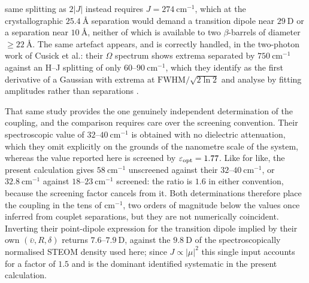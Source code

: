 \documentclass[journal=jpcbfk, manuscript=article, layout=twocolumn, doi=true]{achemso}
\begin{document}
same splitting as $2|J|$ instead requires $J=274~\mathrm{cm^{-1}}$, which at the crystallographic $25.4~\text{\AA}$ separation would demand a transition dipole near $29~\mathrm{D}$ or a separation near $10~\text{\AA}$, neither of which is available to two $\beta$-barrels of diameter $\geq22~\text{\AA}$. The same artefact appears, and is correctly handled, in the two-photon work of Cusick et al.: their $\Omega$ spectrum shows extrema separated by $750~\mathrm{cm^{-1}}$ against an H--J splitting of only $60$--$90~\mathrm{cm^{-1}}$, which they identify as the first derivative of a Gaussian with extrema at $\mathrm{FWHM}/\sqrt{2\ln 2}$ and analyse by fitting amplitudes rather than separations \cite{cusick2026twophoton}.

That same study provides the one genuinely independent determination of the coupling, and the comparison requires care over the screening convention. Their spectroscopic value of $32$--$40~\mathrm{cm^{-1}}$ is obtained with no dielectric attenuation, which they omit explicitly on the grounds of the nanometre scale of the system, whereas the value reported here is screened by $\varepsilon_{\rm opt}=1.77$. Like for like, the present calculation gives $58~\mathrm{cm^{-1}}$ unscreened against their $32$--$40~\mathrm{cm^{-1}}$, or $32.8~\mathrm{cm^{-1}}$ against $18$--$23~\mathrm{cm^{-1}}$ screened: the ratio is $1.6$ in either convention, because the screening factor cancels from it. Both determinations therefore place the coupling in the tens of $\mathrm{cm^{-1}}$, two orders of magnitude below the values once inferred from couplet separations, but they are not numerically coincident. Inverting their point-dipole expression for the transition dipole implied by their own $(\bar\upsilon, R, \delta)$ returns $7.6$--$7.9~\mathrm{D}$, against the $9.8~\mathrm{D}$ of the spectroscopically normalised STEOM density used here; since $J\propto|\mu|^{2}$ this single input accounts for a factor of $1.5$ and is the dominant identified systematic in the present calculation.

\clearpage
\end{document}
